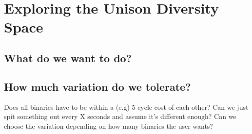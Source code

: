 \chapter{Exploring the Unison Diversity Space}

\section{What do we want to do?}


\section{How much variation do we tolerate?}

Does all binaries have to be within a (e.g) 5-cycle cost of each other? Can we just spit something
out every X seconds and assume it's different enough? Can we choose the variation depending
on how many binaries the user wants? 
